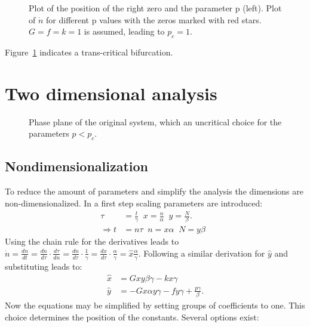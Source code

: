 \begin{figure}

\caption{Plot of the position of the right zero and the parameter p (left). Plot of $\dot{n}$ for different p values with the zeros marked with red stars. $G=f=k=1$ is assumed, leading to $p_c = 1$.}
\label{fig:transBif}
\end{figure}
Figure~\ref{fig:transBif} indicates a trans-critical bifurcation.

\section{Two dimensional analysis}
\begin{figure}

%
\caption{Phase plane of the original system, which an uncritical choice for the parameters $p < p_c$.}
\end{figure}
\subsection{Nondimensionalization}
To reduce the amount of parameters and simplify the analysis the dimensions are non-dimensionalized. In a first step scaling parameters are introduced:
\begin{align}
\tau &= \frac{t}{\gamma} \;\; x = \frac{n}{\alpha} \;\; y = \frac{N}{\beta}. \\
\Rightarrow t &= n\tau \;\;  n = x\alpha \;\; N = y\beta \;\;  
\end{align}
Using the chain rule for the derivatives leads to $\dot{n} = \frac{dn}{dt} = \frac{dn}{d\tau} \cdot \frac{d\tau}{dn} = \frac{dn}{d\tau} \cdot \frac{1}{\gamma} = \frac{dx}{d\tau} \cdot  \frac{\alpha}{\gamma} = \hat{x} \frac{\alpha}{\gamma}$. 
Following a similar derivation for $\hat{y}$ and substituting leads to:
\begin{align}
\hat{x} &= Gxy\beta \gamma - kx\gamma \label{eq:DimOne} \\ 
\hat{y} &= -Gx\alpha y \gamma - fy \gamma + \frac{p\gamma}{\beta} \label{eq:DimTwo}.
\end{align}
Now the equations may be simplified by setting groups of coefficients to one. This choice determines the position of the constants. Several options exist: 
